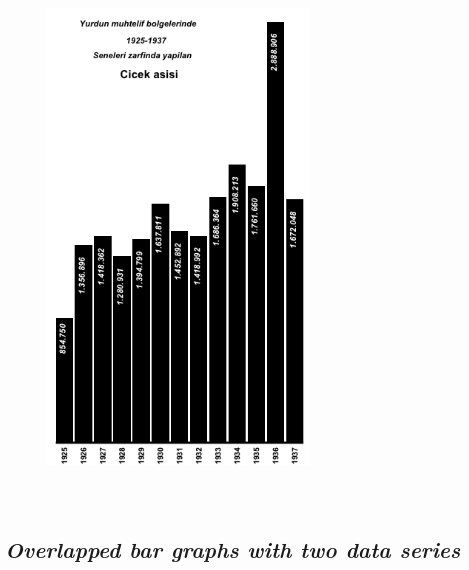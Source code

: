\begin{figure}[ht!]
	\centering
	\includegraphics[width=7cm,height=14cm,keepaspectratio]{Cicekrep2.png}
	\label{fig:mylabelf1}
\end{figure}


\subsection{\textit{Overlapped bar graphs with two data series}}

